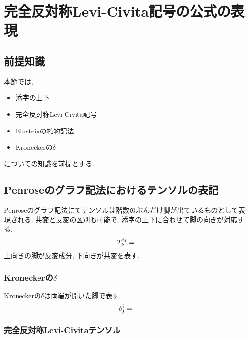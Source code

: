 \documentclass[dvipdfmx]{jsarticle}
\begin{document}
\section{完全反対称Levi-Civita記号の公式の表現}
\label{sec: Levi-Civita}

\subsection{前提知識}

本節では,
\begin{itemize}
    \item 添字の上下
    \item 完全反対称Levi-Civita記号
    \item Einsteinの縮約記法
    \item Kroneckerの$\delta$
\end{itemize}
についての知識を前提とする.


\subsection{Penroseのグラフ記法におけるテンソルの表記}

Penroseのグラフ記法にてテンソルは階数のぶんだけ脚が出ているものとして表現される.
共変と反変の区別も可能で, 添字の上下に合わせて脚の向きが対応する.
\begin{equation*}
    T^{ij}_k
    =
    \vcenter{\hbox{}}
\end{equation*}
上向きの脚が反変成分, 下向きが共変を表す.


\subsubsection{Kroneckerの$\delta$}
\label{sec: Kronecker for tensor}

Kroneckerの$\delta$は両端が開いた脚で表す.
\begin{equation*}
    \delta^i_j
    =
    \vcenter{\hbox{}}
\end{equation*}


\subsubsection{完全反対称Levi-Civitaテンソル}
\end{document}
